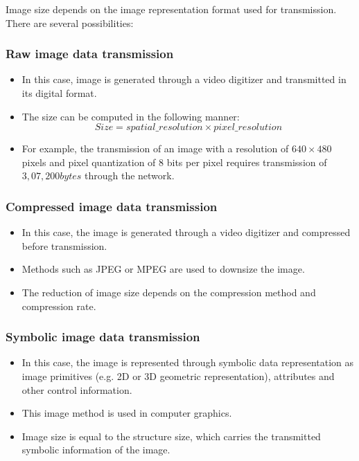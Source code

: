 Image size depends on the image representation format used for transmission. There are several possibilities:

\subsubsection*{Raw image data transmission}
\begin{itemize}
	\item In this case, image is generated through a video digitizer and transmitted in its digital format. 
	\item The size can be computed in the following manner:
	\[
	Size = spatial\_resolution \times pixel\_resolution
	\]
	\item For example, the transmission of an image with a resolution of $ 640 \times 480 $ pixels and pixel quantization of 8 bits per pixel requires transmission of $ 3, 07,200 bytes $ through the network.
\end{itemize}

\subsubsection*{Compressed image data transmission}
\begin{itemize}
	\item In this case, the image is generated through a video digitizer and compressed before transmission. 
	\item Methods such as JPEG or MPEG are used to downsize the image. 
	\item The reduction of image size depends on the compression method and compression rate.
\end{itemize}

\subsubsection*{Symbolic image data transmission}
\begin{itemize}
	\item In this case, the image is represented through symbolic data representation as image primitives (e.g. 2D or 3D geometric representation), attributes and other control information. 
	\item This image method is used in computer graphics.
	\item Image size is equal to the structure size, which carries the transmitted symbolic information of the image.
\end{itemize}

\newpage\thispagestyle{empty}